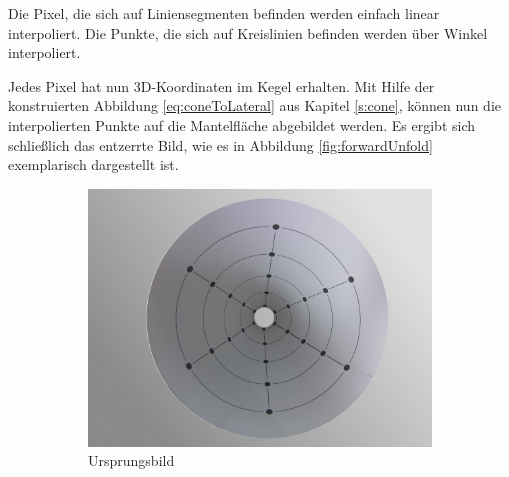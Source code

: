 Die Pixel, die sich auf Liniensegmenten befinden werden einfach linear interpoliert. Die Punkte, die sich auf Kreislinien befinden werden über Winkel interpoliert.

Jedes Pixel hat nun 3D-Koordinaten im Kegel erhalten. Mit Hilfe der konstruierten Abbildung \ref{eq:coneToLateral} aus Kapitel \ref{s:cone}, können nun die interpolierten Punkte auf die Mantelfläche abgebildet werden. Es ergibt sich schließlich das entzerrte Bild, wie es in Abbildung \ref{fig:forwardUnfold} exemplarisch dargestellt ist. 



\begin{figure}[!htb]
	\centering
	\begin{subfigure}{.5\textwidth}
		\centering
		\includegraphics[width=.9\textwidth]{images/coneRasp.jpg}
		\caption{Ursprungsbild}
	\end{subfigure}%
	\begin{subfigure}{.5\textwidth}
		\centering

\end{subfigure}
\end{figure}
